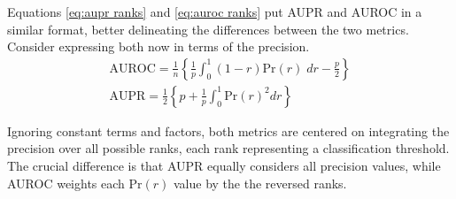 Equations \ref{eq:aupr ranks} and \ref{eq:auroc ranks} put AUPR and AUROC in a similar format, better delineating the differences between the two metrics. Consider expressing both now in terms of the precision.
%
\begin{gather}
    \text{AUROC} = \frac{1}{n} \left\{
        \frac{1}{p}\int_{0}^{1} (1 - r)\text{Pr}(r) \;dr - \frac{p}{2}
    \right\}\\
    \text{AUPR} = \frac{1}{2} \left\{
        p + \frac{1}{p}\int_0^1 \text{Pr}(r)^2 dr
    \right\}
\end{gather}
%
%

%
%
%
%
Ignoring constant terms and factors, both metrics are centered on integrating the precision over all possible ranks, each rank representing a classification threshold. The crucial difference is that AUPR equally considers all precision values, while AUROC weights each $\text{Pr}(r)$ value by the the reversed ranks.

